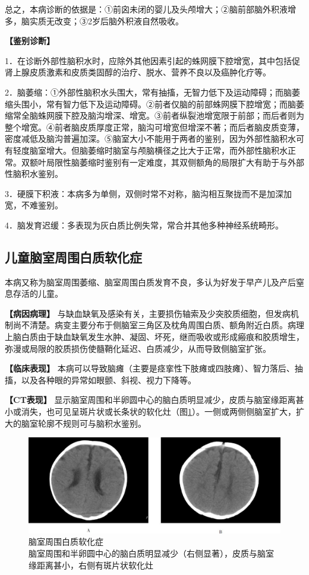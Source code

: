 总之，本病诊断的依据是：①前囟未闭的婴儿及头颅增大；②脑前部脑外积液增多，脑实质无改变；③2岁后脑外积液自然吸收。

\textbf{【鉴别诊断】}

1．在诊断外部性脑积水时，应除外其他因素引起的蛛网膜下腔增宽，其中包括促肾上腺皮质激素和皮质类固醇的治疗、脱水、营养不良以及癌肿化疗等。

2．脑萎缩：①外部性脑积水头围大，常有抽搐，无智力低下及运动障碍；而脑萎缩头围小，常有智力低下及运动障碍。②前者仅脑的前部蛛网膜下腔增宽；而脑萎缩常全脑蛛网膜下腔及脑沟增深、增宽。③前者纵裂池增宽限于前部；而后者则为整个增宽。④前者脑皮质厚度正常，脑沟可增宽但增深不著；而后者脑皮质变薄，密度减低及脑沟普遍加深。⑤脑室大小不能用于两者的鉴别，因为外部性脑积水可有轻度脑室增大。但脑萎缩时脑室与颅脑横径之比大于正常，而外部性脑积水正常。双额叶局限性脑萎缩时鉴别有一定难度，其双侧额角的局限扩大有助于与外部性脑积水鉴别。

3．硬膜下积液：本病多为单侧，双侧时常不对称，脑沟相互聚拢而不是加深加宽，不难鉴别。

4．脑发育迟缓：多表现为灰白质比例失常，常合并其他多种神经系统畸形。

\subsection{儿童脑室周围白质软化症}

本病又称为脑室周围萎缩、脑室周围白质发育不良，多认为好发于早产儿及产后窒息存活的儿童。

\textbf{【病因病理】}
与缺血缺氧及感染有关，主要损伤轴索及少突胶质细胞，但发病机制尚不清楚。病变主要分布于侧脑室三角区及枕角周围白质、额角附近白质。病理上脑白质由于缺血缺氧发生水肿、凝固、坏死，继而吸收或形成瘢痕和胶质增生，弥漫或局限的胶质损伤使髓鞘化延迟、白质减少，从而导致侧脑室扩张。

\textbf{【临床表现】}
本病可以导致脑瘫（主要是痉挛性下肢瘫或四肢瘫）、智力落后、抽搐，以及各种眼的异常如眼颤、斜视、视力下降等。

\textbf{【CT表现】}
显示脑室周围和半卵圆中心的脑白质明显减少，皮质与脑室缘距离甚小或消失，也可见呈斑片状或长条状的软化灶（图\ref{fig2-17}）。一侧或两侧侧脑室扩大，扩大的脑室轮廓不规则可与脑积水鉴别。

\begin{figure}[!htbp]
 \centering
 \includegraphics[width=.7\textwidth,height=\textheight,keepaspectratio]{./images/Image00033.jpg}
 \captionsetup{justification=centering}
 \caption{脑室周围白质软化症\\{\small 脑室周围和半卵圆中心的脑白质明显减少（右侧显著），皮质与脑室缘距离甚小，右侧有斑片状软化灶}}
 \label{fig2-17}
  \end{figure} 



